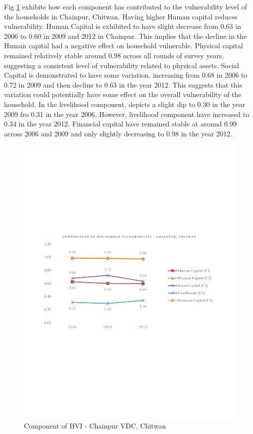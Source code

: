 Fig \ref{fig:hvichainpurComponent} exhibits how each component has contributed to the vulnerability level of the households in Chainpur, Chitwan. Having higher Human capital reduces vulnerability. Human Capital is exhibited to have slight decrease from 0.63 in 2006 to 0.60 in 2009 and 2012 in Chainpur. This implies that the decline in the Human capital had a negative effect on household vulnerable. Physical capital remained relatively stable around 0.98 across all rounds of survey years, suggesting a consistent level of vulnerability related to physical assets. Social Capital is demonstrated to have some variation, increasing from 0.68 in 2006 to 0.72 in 2009 and then decline to 0.63 in the year 2012. This suggests that this variation could potentially have some effect on the overall vulnerability of the household. In the livelihood component, depicts a slight dip to 0.30 in the year 2009 fro 0.31 in the year 2006. However, livelihood component have increased to 0.34 in the year 2012. Financial capital have remained stable at around 0.99 across 2006 and 2009 and only slightly decreasing to 0.98 in the year 2012.

\begin{center}
	\begin{figure}[htb]
		\vspace{-140pt}
		\includegraphics[scale=0.7]{figure/HVI_Component_Chainpur_line.pdf}
		\vspace{-160pt}
		\caption{Component of HVI - Chainpur VDC, Chitwan}
		\setlength{\abovecaptionskip}{6pt}
		\setlength{\belowcaptionskip}{3pt}
		\label{fig:hvichainpurComponent}
	\end{figure}
\end{center}
\vspace{-25pt}

